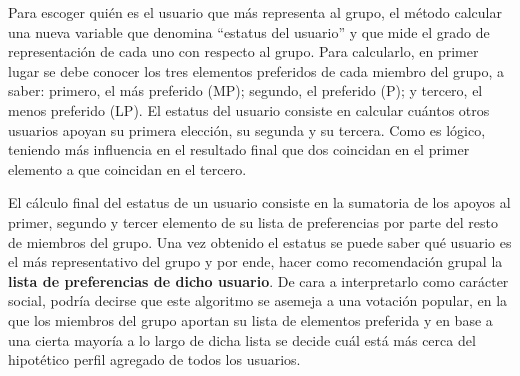 Para escoger quién es el usuario que más representa al grupo, el método calcular una nueva variable que denomina ``estatus del usuario'' y que mide el grado de representación de cada uno con respecto al grupo. Para calcularlo, en primer lugar se debe conocer los tres elementos preferidos de cada miembro del grupo, a saber: primero, el más preferido (MP); segundo, el preferido (P); y tercero, el menos preferido (LP). El estatus del usuario consiste en calcular cuántos otros usuarios apoyan su primera elección, su segunda y su tercera. Como es lógico, teniendo más influencia en el resultado final que dos coincidan en el primer elemento a que coincidan en el tercero.

El cálculo final del estatus de un usuario consiste en la sumatoria de los apoyos al primer, segundo y tercer elemento de su lista de preferencias por parte del resto de miembros del grupo. Una vez obtenido el estatus se puede saber qué usuario es el más representativo del grupo y por ende, hacer como recomendación grupal la \textbf{lista de preferencias de dicho usuario}. De cara a interpretarlo como carácter social, podría decirse que este algoritmo se asemeja a una votación popular, en la que los miembros del grupo aportan su lista de elementos preferida y en base a una cierta mayoría a lo largo de dicha lista se decide cuál está más cerca del hipotético perfil agregado de todos los usuarios.